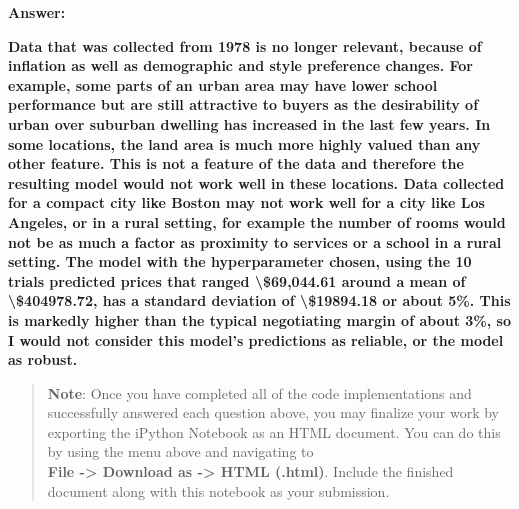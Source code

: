 \documentclass[11pt]{article}
\begin{document}
    \textbf{Answer:}

\textbf{Data that was collected from 1978 is no longer relevant, because
of inflation as well as demographic and style preference changes. For
example, some parts of an urban area may have lower school performance
but are still attractive to buyers as the desirability of urban over
suburban dwelling has increased in the last few years. In some
locations, the land area is much more highly valued than any other
feature. This is not a feature of the data and therefore the resulting
model would not work well in these locations. Data collected for a
compact city like Boston may not work well for a city like Los Angeles,
or in a rural setting, for example the number of rooms would not be as
much a factor as proximity to services or a school in a rural setting.
The model with the hyperparameter chosen, using the 10 trials predicted
prices that ranged \textbackslash{}\$69,044.61 around a mean of
\textbackslash{}\$404978.72, has a standard deviation of
\textbackslash{}\$19894.18 or about 5\%. This is markedly higher than
the typical negotiating margin of about 3\%, so I would not consider
this model's predictions as reliable, or the model as robust.}

    \begin{quote}
\textbf{Note}: Once you have completed all of the code implementations
and successfully answered each question above, you may finalize your
work by exporting the iPython Notebook as an HTML document. You can do
this by using the menu above and navigating to\\
\textbf{File -\textgreater{} Download as -\textgreater{} HTML (.html)}.
Include the finished document along with this notebook as your
submission.
\end{quote}


    
    
    
    
\end{document}
